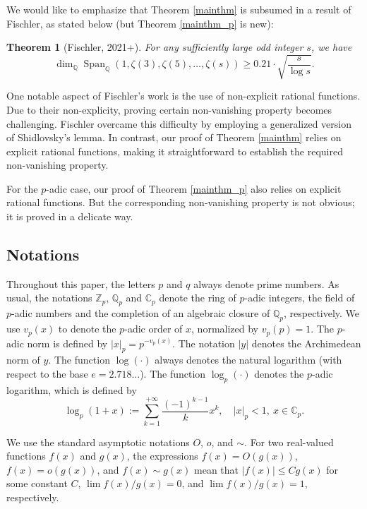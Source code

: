 \documentclass[12pt]{article}
\newtheorem*{theorem*}{Theorem}
\numberwithin{equation}{section}
\begin{document}
\bigskip

We would like to emphasize that Theorem \ref{mainthm} is subsumed in a result of Fischler, as stated below (but Theorem \ref{mainthm_p} is new):

\begin{theorem*}[Fischler\cite{Fis2021+}, 2021+]
For any sufficiently large odd integer $s$, we have
\[ \dim_\mathbb{Q}\operatorname{Span}_{\mathbb{Q}}\left( 1,\zeta(3),\zeta(5),\ldots,\zeta(s) \right) \geqslant 0.21 \cdot \sqrt{\frac{s}{\log s}}.  \]
\end{theorem*}
One notable aspect of Fischler's work is the use of non-explicit rational functions. Due to their non-explicity, proving certain non-vanishing property becomes challenging. Fischler overcame this difficulty by employing a generalized version of Shidlovsky's lemma. In contrast, our proof of Theorem \ref{mainthm} relies on explicit rational functions, making it straightforward to establish the required non-vanishing property. 

For the $p$-adic case, our proof of Theorem \ref{mainthm_p} also relies on explicit rational functions. But the corresponding non-vanishing property is not obvious; it is proved in a delicate way.

\bigskip

\subsection{Notations}
Throughout this paper, the letters $p$ and $q$ always denote prime numbers. As usual, the notations $\mathbb{Z}_p$, $\mathbb{Q}_p$ and $\mathbb{C}_p$ denote the ring of $p$-adic integers, the field of $p$-adic numbers and the completion of an algebraic closure of $\mathbb{Q}_p$, respectively. We use $v_p(x)$ to denote the $p$-adic order of $x$, normalized by $v_p(p)=1$. The $p$-adic norm is defined by $|x|_p = p^{-v_p(x)}$. The notation $|y|$ denotes the Archimedean norm of $y$. The function $\log(\cdot)$ always denotes the natural logarithm (with respect to the base $e = 2.718\ldots$). The function $\log_p(\cdot)$ denotes the $p$-adic logarithm, which is defined by
\[ \log_p(1+x) := \sum_{k=1}^{+\infty} \frac{(-1)^{k-1}}{k} x^k, \quad |x|_p < 1, ~ x \in \mathbb{C}_p. \]

We use the standard asymptotic notations $O$, $o$, and $\sim$. For two real-valued functions $f(x)$ and $g(x)$, the expressions $f(x)=O(g(x))$, $f(x)=o(g(x))$, and $f(x) \sim g(x)$ mean that $|f(x)| \leqslant Cg(x)$ for some constant $C$, $\lim f(x)/g(x) =0$, and $\lim f(x)/g(x) = 1$, respectively.
\end{document}
